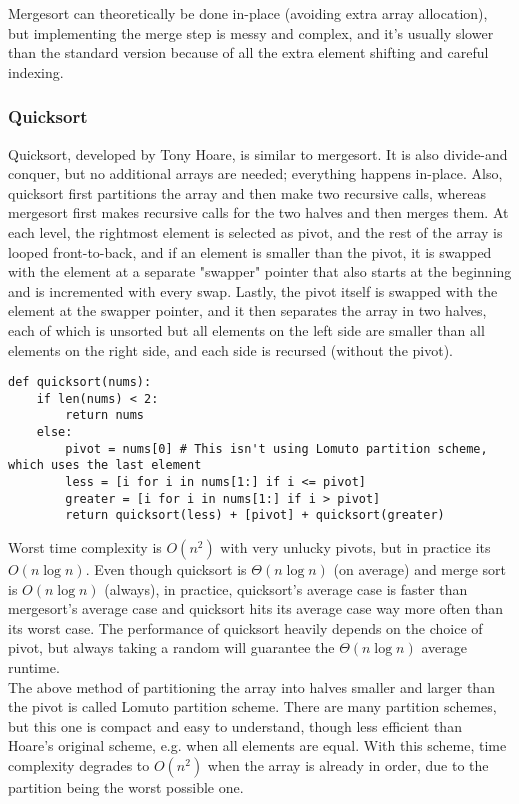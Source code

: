 \documentclass[8pt, table, xcdraw]{article}%
\begin{document}
Mergesort can theoretically be done in-place (avoiding extra array allocation), but implementing the merge step is messy and complex, and it's usually slower than the standard version because of all the extra element shifting and careful indexing.

\subsubsection{Quicksort} \label{quicksort}

Quicksort, developed by Tony Hoare, is similar to mergesort. It is also divide-and conquer, but no additional arrays are needed; everything happens in-place. Also, quicksort first partitions the array and then make two recursive calls, whereas mergesort first makes recursive calls for the two halves and then merges them. At each level, the rightmost element is selected as pivot, and the rest of the array is looped front-to-back, and if an element is smaller than the pivot, it is swapped with the element at a separate "swapper" pointer that also starts at the beginning and is incremented with every swap. Lastly, the pivot itself is swapped with the element at the swapper pointer, and it then separates the array in two halves, each of which is unsorted but all elements on the left side are smaller than all elements on the right side, and each side is recursed (without the pivot).

\begin{lstlisting}
def quicksort(nums):
    if len(nums) < 2:
        return nums
    else:
        pivot = nums[0] # This isn't using Lomuto partition scheme, which uses the last element
        less = [i for i in nums[1:] if i <= pivot]
        greater = [i for i in nums[1:] if i > pivot]
        return quicksort(less) + [pivot] + quicksort(greater)
\end{lstlisting}

Worst time complexity is $O(n^2)$ with very unlucky pivots, but in practice its $O(n \log n)$. Even though quicksort is $\Theta(n \log n)$ (on average) and merge sort is $O(n \log n)$ (always), in practice, quicksort's average case is faster than mergesort's average case and quicksort hits its average case way more often than its worst case. The performance of quicksort heavily depends on the choice of pivot, but always taking a random will guarantee the $\Theta(n \log n)$ average runtime.\\
The above method of partitioning the array into halves smaller and larger than the pivot is called Lomuto partition scheme. There are many partition schemes, but this one is compact and easy to understand, though less efficient than Hoare's original scheme, e.g. when all elements are equal. With this scheme, time complexity degrades to $O(n^2)$ when the array is already in order, due to the partition being the worst possible one.
\end{document}
